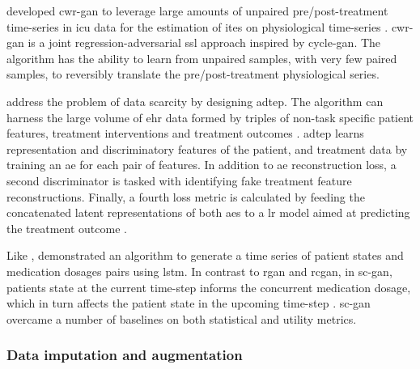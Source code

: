         \citeauthor{mcdermott2018semi} developed \gls{cwr-gan} to leverage large amounts of unpaired pre/post-treatment time-series in \gls{icu} data for the estimation of \glspl{ite} on physiological time-series \cite{mcdermott2018semi}. \gls{cwr-gan} is a joint regression-adversarial  \gls{ssl} approach inspired by \gls{cycle-gan}. The algorithm has the ability to learn from unpaired samples, with very few paired samples, to reversibly translate the pre/post-treatment physiological series.\par 
    
        \citeauthor{chu2019treatment} address the problem of data scarcity by designing \gls{adtep}. The algorithm can harness the large volume of \gls{ehr} data formed by triples of non-task specific patient features, treatment interventions and treatment outcomes \cite{chu2019treatment}. \gls{adtep} learns representation and discriminatory features of the patient, and treatment data by training an \gls{ae} for each pair of features. In addition to \gls{ae} reconstruction loss, a second discriminator is tasked with identifying fake treatment feature reconstructions. Finally, a fourth loss metric is calculated by feeding the concatenated latent representations of both \glspl{ae} to a \gls{lr} model aimed at predicting the treatment outcome \cite{chu2019treatment}.\par
    
        Like \citeauthor{esteban2017real}, \citeauthor{Wang_2019} demonstrated an algorithm to generate a time series of patient states and medication dosages pairs using \gls{lstm}. In contrast to \gls{rgan} and \gls{rcgan}, in \gls{sc-gan}, patients state at the current time-step informs the concurrent medication dosage, which in turn affects the patient state in the upcoming time-step \cite{Wang_2019}. \gls{sc-gan} overcame a number of baselines on both statistical and utility metrics.
    
    \subsubsection{Data imputation and augmentation}
    
